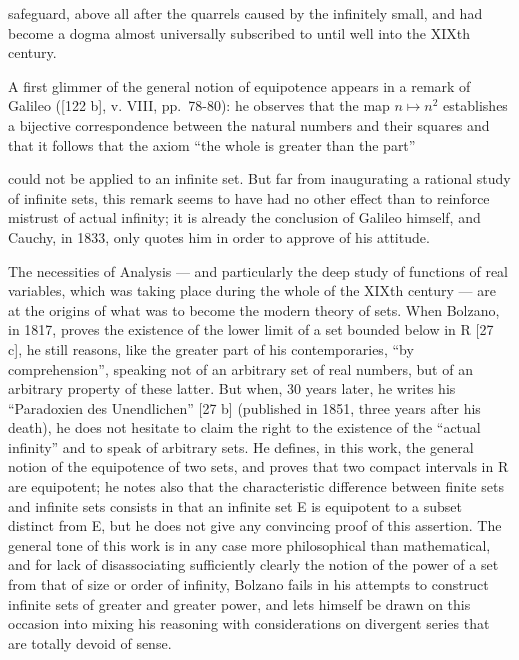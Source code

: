 safeguard, above all after the quarrels caused by the infinitely small, and had become a dogma almost universally subscribed to until well into the XIXth century.

A first glimmer of the general notion of equipotence appears in a remark of Galileo ({[}122 b{]}, v. VIII, pp.~78-80): he observes that the map \(n \mapsto n^2\) establishes a bijective correspondence between the natural numbers and their squares and that it follows that the axiom ``the whole is greater than the part''

could not be applied to an infinite set. But far from inaugurating a rational study of infinite sets, this remark seems to have had no other effect than to reinforce mistrust of actual infinity; it is already the conclusion of Galileo himself, and Cauchy, in 1833, only quotes him in order to approve of his attitude.

The necessities of Analysis --- and particularly the deep study of functions of real variables, which was taking place during the whole of the XIXth century --- are at the origins of what was to become the modern theory of sets. When Bolzano, in 1817, proves the existence of the lower limit of a set bounded below in R {[}27 c{]}, he still reasons, like the greater part of his contemporaries, ``by comprehension'', speaking not of an arbitrary set of real numbers, but of an arbitrary property of these latter. But when, 30 years later, he writes his ``Paradoxien des Unendlichen'' {[}27 b{]} (published in 1851, three years after his death), he does not hesitate to claim the right to the existence of the ``actual infinity'' and to speak of arbitrary sets. He defines, in this work, the general notion of the equipotence of two sets, and proves that two compact intervals in R are equipotent; he notes also that the characteristic difference between finite sets and infinite sets consists in that an infinite set E is equipotent to a subset distinct from E, but he does not give any convincing proof of this assertion. The general tone of this work is in any case more philosophical than mathematical, and for lack of disassociating sufficiently clearly the notion of the power of a set from that of size or order of infinity, Bolzano fails in his attempts to construct infinite sets of greater and greater power, and lets himself be drawn on this occasion into mixing his reasoning with considerations on divergent series that are totally devoid of sense.

